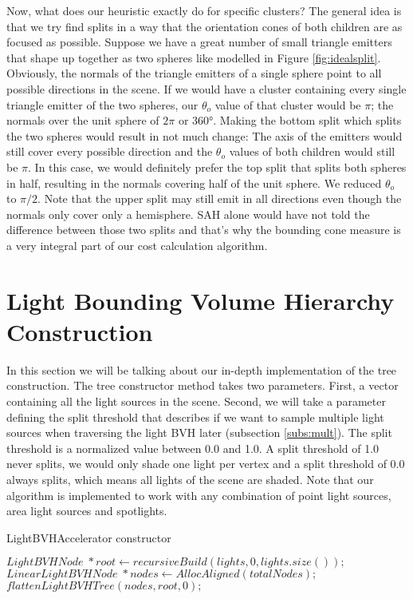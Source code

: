 Now, what does our heuristic exactly do for specific clusters? The general idea is that we try find splits in a way that the orientation cones of both children are as focused as possible. Suppose we have a great number of small triangle emitters that shape up together as two spheres like modelled in Figure \ref{fig:idealsplit}. Obviously, the normals of the triangle emitters of a single sphere point to all possible directions in the scene. If we would have a cluster containing every single triangle emitter of the two spheres, our $\theta_o$ value of that cluster would be $\pi$; the normals over the unit sphere of $2\pi$ or 360°. Making the bottom split which splits the two spheres would result in not much change: The axis of the emitters would still cover every possible direction and the $\theta_o$ values of both children would still be $\pi$. In this case, we would definitely prefer the top split that splits both spheres in half, resulting in the normals covering half of the unit sphere. We reduced $\theta_o$ to $\pi/2$. Note that the upper split may still emit in all directions even though the normals only cover only a hemisphere. SAH alone would have not told the difference between those two splits and that's why the bounding cone measure is a very integral part of our cost calculation algorithm.

\section{Light Bounding Volume Hierarchy Construction}
\label{sec:alg:con}

In this section we will be talking about our in-depth implementation of the tree construction. The tree constructor method takes two parameters. First, a vector containing all the light sources in the scene. Second, we will take a parameter defining the split threshold that describes if we want to sample multiple light sources when traversing the light BVH later (subsection \ref{subs:mult}). The split threshold is a normalized value between 0.0 and 1.0. A split threshold of 1.0 never splits, we would only shade one light per vertex and a split threshold of 0.0 always splits, which means all lights of the scene are shaded. Note that our algorithm is implemented to work with any combination of point light sources, area light sources and spotlights.

\begin{algorithm}
	\caption{LightBVHAccelerator constructor}
	\label{LightBVHAccelerator}
	\begin{algorithmic}[1] %
		\State $LightBVHNode \; *root  \gets recursiveBuild(lights, 0, lights.size());$
		\State $LinearLightBVHNode \; *nodes \gets AllocAligned(totalNodes);$ 
		\State $flattenLightBVHTree(nodes, root, 0);$
		\EndProcedure
	\end{algorithmic}
\end{algorithm}

